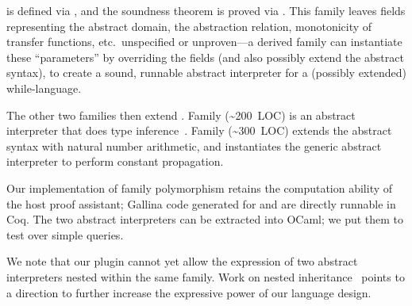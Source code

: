\noindent
{} is defined via , and the soundness theorem
is proved via .
This family leaves fields representing the abstract domain, the
abstraction relation, monotonicity of transfer functions, etc.\ 
unspecified or unproven---a derived family can instantiate these
``parameters'' by overriding the fields (and also possibly extend the abstract syntax),
to create a sound, runnable abstract interpreter for a (possibly extended) while-language.

The other two families then extend .
Family  (\textasciitilde200~LOC) is an abstract
interpreter that does type inference~\cite{cousot1997types}.
Family  (\textasciitilde300~LOC) extends the abstract syntax
with natural number arithmetic,
and instantiates the generic abstract interpreter to perform constant propagation.

Our implementation of family polymorphism retains the computation
ability of the host proof assistant;
Gallina code generated for  and  are directly
runnable in Coq.
The two abstract interpreters can be extracted into OCaml;
we put them to test over simple queries.

We note that our plugin cannot yet allow the expression of two abstract
interpreters nested within the same family.
Work on nested inheritance~\cite{ncm2004,zm2017} points to a direction
to further increase the expressive power of our language design.

